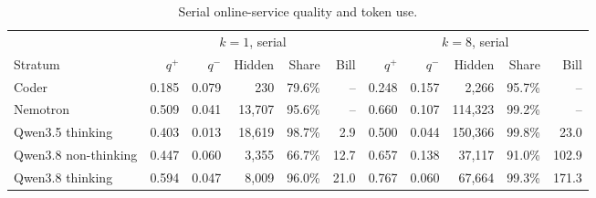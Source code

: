 
\begin{table}[t]
\caption{Serial online-service quality and token use.}
\label{tab:service-quality}
\centering\small\setlength{\tabcolsep}{4pt}
\begin{tabular}{lrrrrrrrrrr}
\toprule
 & \multicolumn{5}{c}{$k=1$, serial} & \multicolumn{5}{c}{$k=8$, serial} \\
\cmidrule(lr){2-6}\cmidrule(lr){7-11}
Stratum & $q^+$ & $q^-$ & Hidden & Share & Bill & $q^+$ & $q^-$ & Hidden & Share & Bill \\
\midrule
Coder & 0.185 & 0.079 & 230 & 79.6\% & -- & 0.248 & 0.157 & 2,266 & 95.7\% & -- \\
Nemotron & 0.509 & 0.041 & 13,707 & 95.6\% & -- & 0.660 & 0.107 & 114,323 & 99.2\% & -- \\
Qwen3.5 thinking & 0.403 & 0.013 & 18,619 & 98.7\% & 2.9 & 0.500 & 0.044 & 150,366 & 99.8\% & 23.0 \\
Qwen3.8 non-thinking & 0.447 & 0.060 & 3,355 & 66.7\% & 12.7 & 0.657 & 0.138 & 37,117 & 91.0\% & 102.9 \\
Qwen3.8 thinking & 0.594 & 0.047 & 8,009 & 96.0\% & 21.0 & 0.767 & 0.060 & 67,664 & 99.3\% & 171.3 \\
\bottomrule
\end{tabular}
\end{table}
